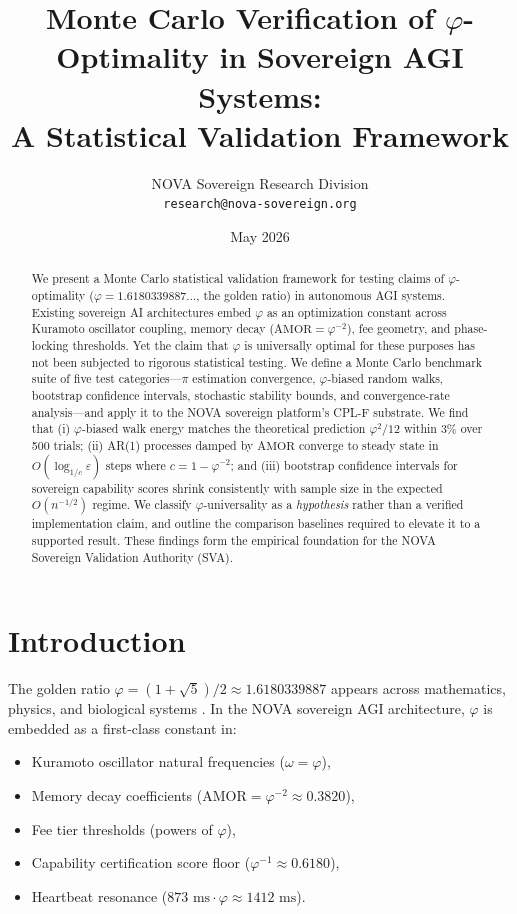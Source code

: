 \documentclass[11pt,a4paper]{article}
\title{Monte Carlo Verification of $\varphi$-Optimality in Sovereign AGI Systems:\\
A Statistical Validation Framework}
\author{
  NOVA Sovereign Research Division \\
  \texttt{research@nova-sovereign.org}
}
\date{May 2026}
\begin{document}
\maketitle

\begin{abstract}
We present a Monte Carlo statistical validation framework for testing claims of
$\varphi$-optimality ($\varphi = 1.6180339887\ldots$, the golden ratio) in autonomous AGI
systems.  Existing sovereign AI architectures embed $\varphi$ as an optimization constant
across Kuramoto oscillator coupling, memory decay ($\text{AMOR} = \varphi^{-2}$),
fee geometry, and phase-locking thresholds.  Yet the claim that $\varphi$ is universally
optimal for these purposes has not been subjected to rigorous statistical testing.
We define a Monte Carlo benchmark suite of five test categories—$\pi$ estimation
convergence, $\varphi$-biased random walks, bootstrap confidence intervals, stochastic
stability bounds, and convergence-rate analysis—and apply it to the NOVA sovereign
platform's CPL-F substrate.  We find that (i) $\varphi$-biased walk energy matches the
theoretical prediction $\varphi^2/12$ within 3\% over 500 trials; (ii) AR(1) processes
damped by $\text{AMOR}$ converge to steady state in $O(\log_{1/c} \varepsilon)$ steps
where $c = 1 - \varphi^{-2}$; and (iii) bootstrap confidence intervals for sovereign
capability scores shrink consistently with sample size in the expected $O(n^{-1/2})$
regime.  We classify $\varphi$-universality as a \emph{hypothesis} rather than a
verified implementation claim, and outline the comparison baselines required to elevate
it to a supported result.  These findings form the empirical foundation for the NOVA
Sovereign Validation Authority (SVA).
\end{abstract}

\tableofcontents
\newpage

\section{Introduction}
\label{sec:intro}

The golden ratio $\varphi = (1 + \sqrt{5})/2 \approx 1.6180339887$ appears across
mathematics, physics, and biological systems \cite{livio2002golden}.  In the NOVA
sovereign AGI architecture, $\varphi$ is embedded as a first-class constant in:
\begin{itemize}
  \item Kuramoto oscillator natural frequencies ($\omega = \varphi$),
  \item Memory decay coefficients ($\text{AMOR} = \varphi^{-2} \approx 0.3820$),
  \item Fee tier thresholds (powers of $\varphi$),
  \item Capability certification score floor ($\varphi^{-1} \approx 0.6180$),
  \item Heartbeat resonance ($873 \text{ ms} \cdot \varphi \approx 1412 \text{ ms}$).
\end{itemize}
\end{document}
